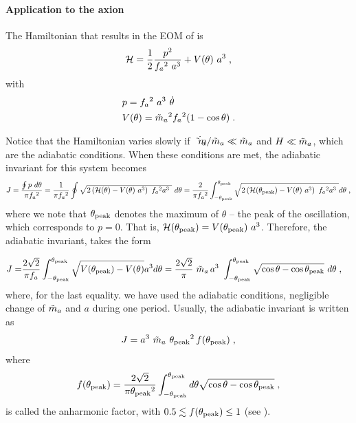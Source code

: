 \documentclass[11pt,a4paper]{article}
\begin{document}
\paragraph{Application to the axion}
%
The Hamiltonian that results in the EOM of  is
%
\begin{equation}
	\mathcal{H} = \dfrac{1}{2} \dfrac{p^2}{f_{a}{}^2 \ a^3} + V(\theta) \ a^3\;,
	\label{eq:axion_H}
\end{equation}
%
with 
%
\begin{eqnarray}
	& p = f_{a}{}^2 \ a^3 \ \dot \theta \\
	\label{eq:momentum}
	& V(\theta) = \tilde m_{a}{}^2 f_{a}{}^2 (1-\cos \theta) \;.
	\label{eq:potential}
\end{eqnarray}

Notice that the Hamiltonian varies slowly if $\dot {\tilde m_{a}{}}/\tilde m_{a}{} \ll \tilde m_{a}{}$ and $H \ll \tilde m_{a}{}$, which are the adiabatic conditions.  When these conditions are met, the adiabatic invariant for this system becomes
%
\begin{equation}
	J = \dfrac{\oint p \ d \theta}{\pi f_{a}{}^2} = \dfrac{1}{\pi f_{a}{}^2} \oint \sqrt{ 2\left(  \mathcal{H}(\theta) - V(\theta) \ a^3 \right) \ f_{a}{}^2 a^3 \ }  \ d \theta  =
	 \dfrac{2}{\pi f_{a}{}^2} \int_{-\theta_{\rm peak}{}}^{\theta_{\rm peak}{}} \sqrt{ 2\left(  \mathcal{H}(\theta_{\rm peak}{}) - V(\theta) \ a^3 \right) \ f_{a}{}^2 a^3 \ } d \theta \;,
	 \label{eq:J_axion_definition}
\end{equation}
%
where we note that $\theta_{\rm peak}{}$ denotes the maximum of $\theta$ -- the peak of the oscillation, which corresponds to $p=0$. That is, $\Ham(\thetamax) = V(\thetamax) \ a^3$. Therefore, the adiabatic invariant, takes the form 

\begin{eqnarray}
	J=&  \dfrac{2 \sqrt{2} }{\pi f_{a}{}}  \int_{- \theta_{\rm peak}{}} ^{\theta_{\rm peak}{}}  \sqrt{ V(\theta_{\rm peak}{}) - V(\theta) } a^{3} d \theta = 
	\dfrac{2 \sqrt{2} }{\pi} \ \tilde m_{a}{} \, a^3 \ \displaystyle \int_{- \theta_{\rm peak}{}}^{\theta_{\rm peak}{}} \sqrt{\cos \theta - \cos \theta_{\rm peak}{}} \ d \theta  
	\;,
	\label{eq:J_axion_derivation}
\end{eqnarray}
%
where, for the last equality. we have used the adiabatic conditions, \ie negligible change of $\tilde m_{a}{}$ and $a$ during one period. Usually, the adiabatic invariant is written as~\cite{Lyth:1991ub,Bae:2008ue} 
%
\begin{equation}
	J = a^3 \ \tilde m_{a}{} \ \theta_{\rm peak}{}^2  \, f(\theta_{\rm peak}{})  \;,
	\label{eq:J_axion_final_form}
\end{equation}
%
where 
\begin{equation}
	f(\theta_{\rm peak}{}) =\dfrac{ 2 \sqrt{2}}{\pi \theta_{\rm peak}{}^2 } \displaystyle \int_{- \theta_{\rm peak}{}}^{\theta_{\rm peak}{}} d \theta \sqrt{ \cos \theta - \cos \theta_{\rm peak}{} } \;,
	\label{eq:anharmonic_f}
\end{equation}
%
is called the anharmonic factor, with $ 0.5 \lesssim f(\theta_{\rm peak}{}) \leq 1$ (see ).
\end{document}
